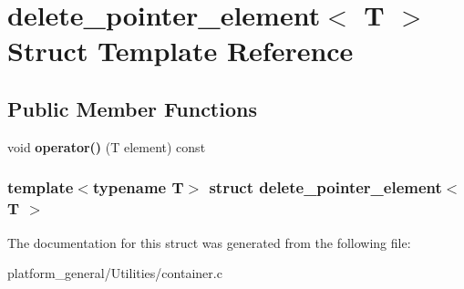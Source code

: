 \hypertarget{structdelete__pointer__element}{\section{delete\-\_\-pointer\-\_\-element$<$ \-T $>$ \-Struct \-Template \-Reference}
\label{structdelete__pointer__element}
}
\subsection*{\-Public \-Member \-Functions}
\begin{DoxyCompactItemize}
\item 
\hypertarget{structdelete__pointer__element_a387dc05986cb0d27584fb5fe773e11d9}{void {\bfseries operator()} (\-T element) const }\label{structdelete__pointer__element_a387dc05986cb0d27584fb5fe773e11d9}

\end{DoxyCompactItemize}
\subsubsection*{template$<$typename T$>$ struct delete\-\_\-pointer\-\_\-element$<$ T $>$}



\-The documentation for this struct was generated from the following file\-:\begin{DoxyCompactItemize}
\item 
platform\-\_\-general/\-Utilities/container.\-c\end{DoxyCompactItemize}
